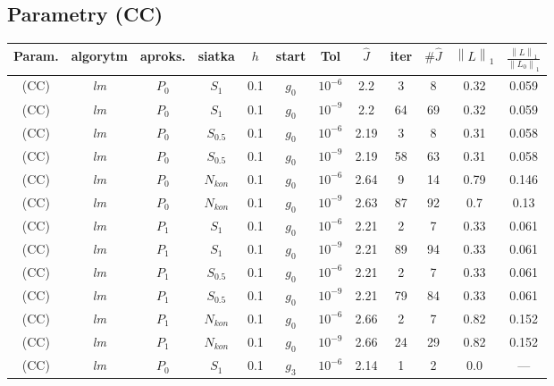 \documentclass[licencjacka]{pracamgr}
\newcommand{\norm}[1]{\left\lVert#1\right\rVert}
\begin{document}
\subsection{Parametry (CC)}

\begin{table}[h]
  \begin{center}
    \begin{tabular}{|c|c|c|c|c|c|c||c|c|c|c|c|}
      \hline
      Param. & algorytm & aproks. & siatka & $h$ & start & Tol & $\hat{J}$ & iter & $\#\hat{J}$ & $\norm{L}_1$ & $\frac{\norm{L}_1}{\norm{L_0}_1}$ \\
      \hline
      (CC) & {\it lm\/} & $P_0$ & $S_1$ & 0.1 & $g_0$ & $10^{-6}$ & 2.2 & 3 & 8 & 0.32 & 0.059 \\
      \hline
      (CC) & {\it lm\/} & $P_0$ & $S_1$ & 0.1 & $g_0$ & $10^{-9}$ & 2.2 & 64 & 69 & 0.32 & 0.059 \\
      \hline
      (CC) & {\it lm\/} & $P_0$ & $S_{0.5}$ & 0.1 & $g_0$ & $10^{-6}$ & 2.19 & 3 & 8 & 0.31 & 0.058 \\
      \hline
      (CC) & {\it lm\/} & $P_0$ & $S_{0.5}$ & 0.1 & $g_0$ & $10^{-9}$ & 2.19 & 58 & 63 & 0.31 & 0.058 \\
      \hline
      (CC) & {\it lm\/} & $P_0$ & $N_{kon}$ & 0.1 & $g_0$ & $10^{-6}$ & 2.64 & 9 & 14 & 0.79 & 0.146 \\
      \hline
      (CC) & {\it lm\/} & $P_0$ & $N_{kon}$ & 0.1 & $g_0$ & $10^{-9}$ & 2.63 & 87 & 92 & 0.7 & 0.13 \\
      \hline
      (CC) & {\it lm\/} & $P_1$ & $S_1$ & 0.1 & $g_0$ & $10^{-6}$ & 2.21 & 2 & 7 & 0.33 & 0.061 \\
      \hline
      (CC) & {\it lm\/} & $P_1$ & $S_1$ & 0.1 & $g_0$ & $10^{-9}$ & 2.21 & 89 & 94 & 0.33 & 0.061 \\
      \hline
      (CC) & {\it lm\/} & $P_1$ & $S_{0.5}$ & 0.1 & $g_0$ & $10^{-6}$ & 2.21 & 2 & 7 & 0.33 & 0.061 \\
      \hline
      (CC) & {\it lm\/} & $P_1$ & $S_{0.5}$ & 0.1 & $g_0$ & $10^{-9}$ & 2.21 & 79 & 84 & 0.33 & 0.061 \\
      \hline
      (CC) & {\it lm\/} & $P_1$ & $N_{kon}$ & 0.1 & $g_0$ & $10^{-6}$ & 2.66 & 2 & 7 & 0.82 & 0.152 \\
      \hline
      (CC) & {\it lm\/} & $P_1$ & $N_{kon}$ & 0.1 & $g_0$ & $10^{-9}$ & 2.66 & 24 & 29 & 0.82 & 0.152 \\
      \hline
      (CC) & {\it lm\/} & $P_0$ & $S_1$ & 0.1 & $g_3$ & $10^{-6}$ & 2.14 & 1 & 2 & 0.0 & --- \\

\end{tabular}
\end{center}
\end{table}
\end{document}
